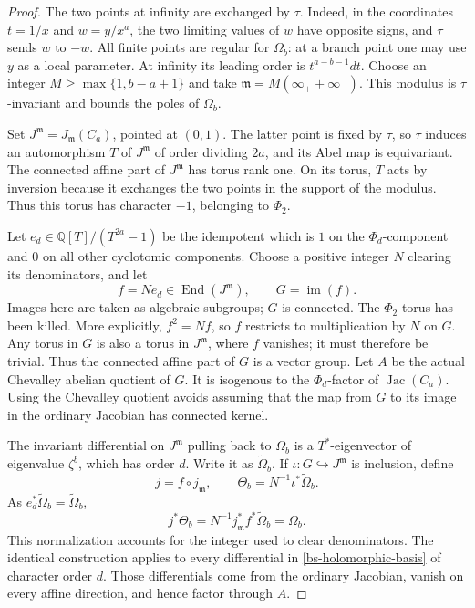 \documentclass[11pt,a4paper]{article}
\theoremstyle{definition}
\theoremstyle{remark}
\numberwithin{equation}{section}
\begin{document}
\begin{proof}
The two points at infinity are exchanged by $\tau$.  Indeed, in the
coordinates $t=1/x$ and $w=y/x^a$, the two limiting values of $w$ have
opposite signs, and $\tau$ sends $w$ to $-w$.  All finite points are
regular for $\Omega_b$: at a branch point one may use $y$ as a local
parameter.  At infinity its leading order is $t^{a-b-1}dt$.
Choose an integer
$M\ge\max\{1,b-a+1\}$ and take
$\mathfrak m=M(\infty_++\infty_-)$.  This modulus is
$\tau$-invariant and bounds the poles of $\Omega_b$.

Set $J^{\mathfrak m}=J_{\mathfrak m}(C_a)$, pointed at $(0,1)$.
The latter point is fixed by $\tau$, so $\tau$ induces an automorphism
$T$ of $J^{\mathfrak m}$ of order dividing $2a$, and its Abel map is
equivariant.  The connected affine part of $J^{\mathfrak m}$ has
torus rank one.  On its torus, $T$ acts by inversion because it exchanges
the two points in the support of the modulus.  Thus this torus has
character $-1$, belonging to $\Phi_2$.

Let $e_d\in\mathbb Q[T]/(T^{2a}-1)$ be the idempotent which is $1$
on the $\Phi_d$-component and $0$ on all other cyclotomic components.
Choose a positive integer $N$ clearing its denominators, and let
\[
 f=N e_d\in\operatorname{End}(J^{\mathfrak m}),\qquad
 G=\operatorname{im}(f).
\]
Images here are taken as algebraic subgroups; $G$ is connected.
The $\Phi_2$ torus has been killed.  More explicitly, $f^2=Nf$, so
$f$ restricts to multiplication by $N$ on $G$.  Any torus in $G$ is
also a torus in $J^{\mathfrak m}$, where $f$ vanishes; it must
therefore be trivial.  Thus the connected affine part of $G$ is a
vector group.  Let $A$ be the actual
Chevalley abelian quotient of $G$.  It is isogenous to the
$\Phi_d$-factor of $\operatorname{Jac}(C_a)$.  Using the Chevalley
quotient avoids assuming that the map from $G$ to its image in the
ordinary Jacobian has connected kernel.

The invariant differential on $J^{\mathfrak m}$ pulling back to
$\Omega_b$ is a $T^*$-eigenvector of eigenvalue $\zeta^b$, which has
order $d$.  Write it as $\widetilde\Omega_b$.  If
$\iota:G\hookrightarrow J^{\mathfrak m}$ is inclusion, define
\[
 j=f\circ j_{\mathfrak m},\qquad
 \Theta_b=N^{-1}\iota^*\widetilde\Omega_b.
\]
As $e_d^*\widetilde\Omega_b=\widetilde\Omega_b$,
\[
 j^*\Theta_b
 =N^{-1}j_{\mathfrak m}^*f^*\widetilde\Omega_b
 =\Omega_b.
\]
This normalization accounts for the integer used to clear denominators.
The identical construction applies to every differential in
\eqref{bs-holomorphic-basis} of character order $d$.  Those
differentials come from the ordinary Jacobian, vanish on every affine
direction, and hence factor through $A$.


\end{proof}
\end{document}
